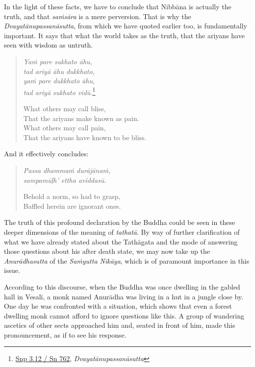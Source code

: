 In the light of these facts, we have to conclude that Nibbāna is actually the truth, and that \emph{saṁsāra} is a mere perversion. That is why the \emph{Dvayatānupassanāsutta}, from which we have quoted earlier too, is fundamentally important. It says that what the world takes as the truth, that the ariyans have seen with wisdom as untruth.

\begin{quote}
\emph{Yaṁ pare sukhato āhu,}\\
\emph{tad ariyā āhu dukkhato,}\\
\emph{yaṁ pare dukkhato āhu,}\\
\emph{tad ariyā sukhato vidū.}\footnote{\href{https://suttacentral.net/snp3.12/pli/ms}{Snp 3.12 / Sn 762}, \emph{Dvayatānupassanāsutta}}

What others may call bliss,\\
That the ariyans make known as pain.\\
What others may call pain,\\
That the ariyans have known to be bliss.
\end{quote}

And it effectively concludes:

\begin{quote}
\emph{Passa dhammaṁ durājānaṁ,}\\
\emph{sampamūḷh' ettha aviddasū.}

Behold a norm, so had to grasp,\\
Baffled herein are ignorant ones.
\end{quote}

The truth of this profound declaration by the Buddha could be seen in these deeper dimensions of the meaning of \emph{tathatā}. By way of further clarification of what we have already stated about the Tathāgata and the mode of answering those questions about his after death state, we may now take up the \emph{Anurādhasutta} of the \emph{Saṁyutta Nikāya}, which is of paramount importance in this issue.

According to this discourse, when the Buddha was once dwelling in the gabled hall in Vesalī, a monk named Anurādha was living in a hut in a jungle close by. One day he was confronted with a situation, which shows that even a forest dwelling monk cannot afford to ignore questions like this. A group of wandering ascetics of other sects approached him and, seated in front of him, made this pronouncement, as if to see his response.


